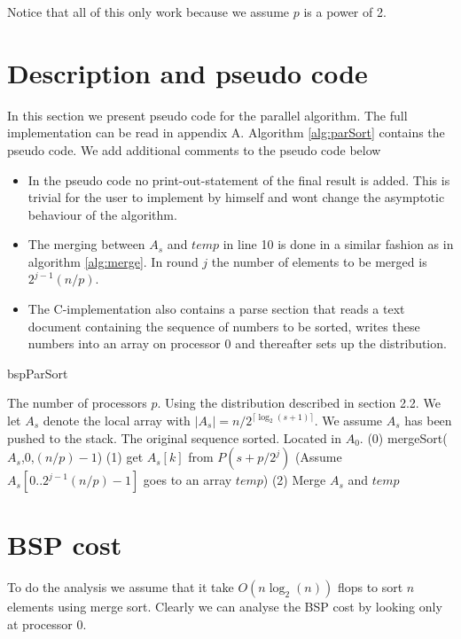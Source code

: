 \documentclass[a4paper,12pt,article]{memoir}
\theoremstyle{plain}
\theoremstyle{definition}
\theoremstyle{remark}
\theoremstyle{plain}
\theoremstyle{remark}
\begin{document}
Notice that all of this only work because we assume $p$ is a power of 2. 
\section{Description and pseudo code}
In this section we present pseudo code for the parallel algorithm. The full implementation can be read in appendix A. Algorithm \ref{alg:parSort} contains the pseudo code. We add additional comments to the pseudo code below
\begin{itemize}
\item In the pseudo code no print-out-statement of the final result is added. This is trivial for the user to implement by himself and wont change the asymptotic behaviour of the algorithm.
\item The merging between $A_s$ and $temp$ in line 10 is done in a similar fashion as in algorithm \ref{alg:merge}. In round $j$ the number of elements to be merged is $2^{j-1}(n/p)$. 
\item The C-implementation also contains a parse section that reads a text document containing the sequence of numbers to be sorted, writes these numbers into an array on processor 0 and thereafter sets up the distribution.  
\end{itemize}
\begin{algorithm}
\caption{bspParSort}
\label{alg:parSort}
\begin{algorithmic}[1]
\Require The number of processors $p$. Using the distribution described in section 2.2. We let $A_s$ denote the local array with $\vert A_s\vert = n/2^{\lceil \log_2(s+1)\rceil}$. We assume $A_s$ has been pushed to the stack. 
\Ensure The original sequence sorted. Located in $A_0$. 
\State (0)
\State mergeSort($A_s$,$0$,$(n/p)-1$) 
\State (1)
\State get $A_s[k]$ from $P(s+p/2^j)$ (Assume $A_s[0..2^{j-1}(n/p)-1]$ goes to an array $temp$)
\EndFor
\EndIf
\State (2)
\State Merge $A_s$ and $temp$
\EndIf
\EndFor
\end{algorithmic}
\end{algorithm}

\section{BSP cost}
To do the analysis we assume that it take $O(n\log_2(n))$ flops to sort $n$ elements using merge sort. Clearly we can analyse the BSP cost by looking only at processor 0. 
\end{document}
